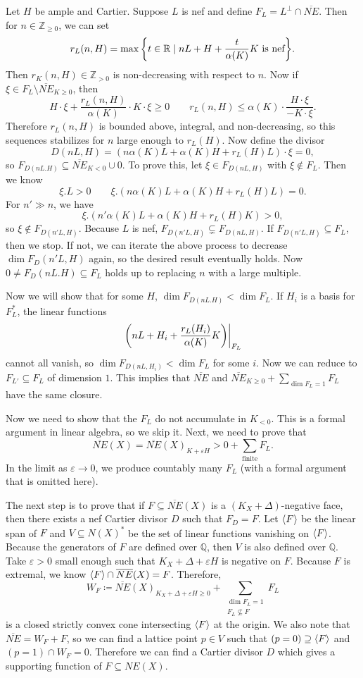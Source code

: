 \documentclass[leqno, openany]{memoir}
\theoremstyle{definition}
\theoremstyle{remark}
\theoremstyle{plain}
\theoremstyle{definition}
\theoremstyle{remark}
\newcommand{\R}{\mathbb{R}}
\newcommand{\Z}{\mathbb{Z}}
\newcommand{\Q}{\mathbb{Q}}
\newcommand{\ep}{\varepsilon}
\newcommand{\ol}[1]{\overline{#1}}
\begin{document}
Let $H$ be ample and Cartier. Suppose $L$ is nef and define $F_L = L^{\perp} \cap \ol{NE}$. Then for $n \in \Z_{\geq 0}$, we can set
\[ r_L(n, H) = \max \qty{t \in \R \mid nL + H + \frac{t}{\alpha(K)} K\ \text{is nef}}. \]
Then $r_K(n, H) \in \Z_{>0}$ is non-decreasing with respect to $n$. Now if $\xi \in F_L \setminus \ol{NE}_{K \geq 0}$, then 
\[ H \cdot \xi + \frac{r_L (n, H)}{\alpha(K)} \cdot K \cdot \xi \geq 0 \qquad r_L(n, H) \leq \alpha(K) \cdot \frac{H \cdot \xi}{- K \cdot \xi}. \]
Therefore $r_L(n, H)$ is bounded above, integral, and non-decreasing, so this sequences stabilizes for $n$ large enough to $r_L(H)$. Now define the divisor 
\[ D(nL, H) = ( n \alpha(K) L + \alpha(K) H + r_L(H) L ) \cdot \xi = 0, \] 
so $F_{D(nL . H)} \subseteq \ol{NE}_{K < 0} \cup \qty{0}$. 
To prove this, let $\xi \in F_{D(nL, H)}$ with $\xi \notin F_L$. Then we know
\[ \xi.L > 0 \qquad \xi. (n \alpha(K)L + \alpha(K)H + r_L(H)L) = 0. \]
For $n' \gg n$, we have
\[ \xi . (n' \alpha(K)L + \alpha(K)H + r_L(H)K) > 0, \]
so $\xi \notin F_{D(n'L, H)}$. Because $L$ is nef, $F_{D(n'L, H)} \subsetneq F_{D(nL, H)}$. If $F_{D(n'L, H)} \subseteq F_L$, then we stop. If not, we can iterate the above process to decrease $\dim F_D(n'L, H)$ again, so the desired result eventually holds.
Now $0 \neq F_D(nL.H) \subseteq F_L$ holds up to replacing $n$ with a large multiple.

Now we will show that for some $H$, $\dim F_{D(nL.H)} < \dim F_L$. If $H_i$ is a basis for $F_L^*$, the linear functions
\[ \eval{\qty(nL + H_i + \frac{r_L(H_i)}{\alpha(K)} K)}_{F_L} \]
cannot all vanish, so $\dim F_{D(nL, H_i)} < \dim F_L$ for some $i$. Now we can reduce to $F_{L'} \subseteq F_L$ of dimension $1$. This implies that $\ol{NE}$ and $\ol{NE}_{K \geq 0} + \sum_{\dim F_L = 1} F_L$ have the same closure.

Now we need to show that the $F_L$ do not accumulate in $K_{< 0}$. This is a formal argument in linear algebra, so we skip it. Next, we need to prove that
\[ \ol{NE}(X) = { \ol{NE}(X) }_{K + \ep H} > 0 + \sum_{\text{finite}} F_L. \]
In the limit as $\ep \to 0$, we produce countably many $F_L$ (with a formal argument that is omitted here). 

The next step is to prove that if $F \subseteq \ol{NE}(X)$ is a $(K_X + \Delta)$-negative face, then there exists a nef Cartier divisor $D$ such that $F_D = F$. Let $\ev{F}$ be the linear span of $F$ and $V \subseteq {N(X)}^*$ be the set of linear functions vanishing on $\ev{F}$. Because the generators of $F$ are defined over $\Q$, then $V$ is also defined over $\Q$. Take $\ep > 0$ small enough such that $K_X + \Delta + \ep H$ is negative on $F$. Because $F$ is extremal, we know $\ev{F} \cap \ol{NE}(X) = F$. Therefore, 
\[ W_F \coloneqq { \ol{NE}(X) }_{K_X + \Delta + \ep H \geq 0} + \sum_{\substack{\dim F_L = 1 \\ F_L \not\subseteq F}} F_L \]
is a closed strictly convex cone intersecting $\ev{F}$ at the origin. We also note that $\ol{NE} = W_F + F$, so we can find a lattice point $p \in V$ such that $(p = 0) \supseteq \ev{F}$ and $(p=1) \cap W_F = 0$. Therefore we can find a Cartier divisor $D$ which gives a supporting function of $F \subseteq NE(X)$.
\end{document}
